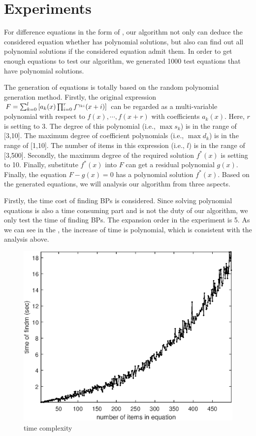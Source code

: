 \section{Experiments} \label{Experiments-02}

For difference equations in the form of , our algorithm not only can deduce the considered equation whether has polynomial solutions, but also can find out all polynomial solutions if the considered equation admit them. In order to get enough equations to test our algorithm, we generated 1000 test equations that have polynomial solutions.

The generation of equations is totally based on the random polynomial generation method. Firstly, the original expression $F=\sum_{k=0}^l{\left[a_k(x)\prod_{i=0}^r{f^{\gamma_{ki}}(x+i)}\right]}$ can be regarded as a multi-variable polynomial with respect to $f(x),\cdots,f(x+r)$ with coefficients $a_k(x)$. Here, $r$ is setting to 3. The degree of this polynomial (i.e., $\max s_k$) is in the range of [3,10]. The maximum degree of coefficient polynomials (i.e., $\max d_k$) is in the range of [1,10]. The number of items in this expression (i.e., $l$) is in the range of [3,500]. Secondly, the maximum degree of the required solution $f^*(x)$ is setting to 10. Finally, substitute $f^*(x)$ into $F$ can get a residual polynomial $g(x)$. Finally, the equation $F-g(x)=0$ has a polynomial solution $f^*(x)$. Based on the generated equations, we will analysis our algorithm from three aspects.

Firstly, the time cost of finding BPs is considered. Since solving polynomial equations is also a time consuming part and is not the duty of our algorithm, we only test the time of finding BPs. The expansion order in the experiment is 5. As we can see in the , the  increase of time is polynomial, which is consistent with the analysis above.
\begin{figure}[H]
\centering
\includegraphics[width=\figwidth]{fig/nlt.eps}
\caption{time complexity}
\label{t-findm}
\end{figure}

